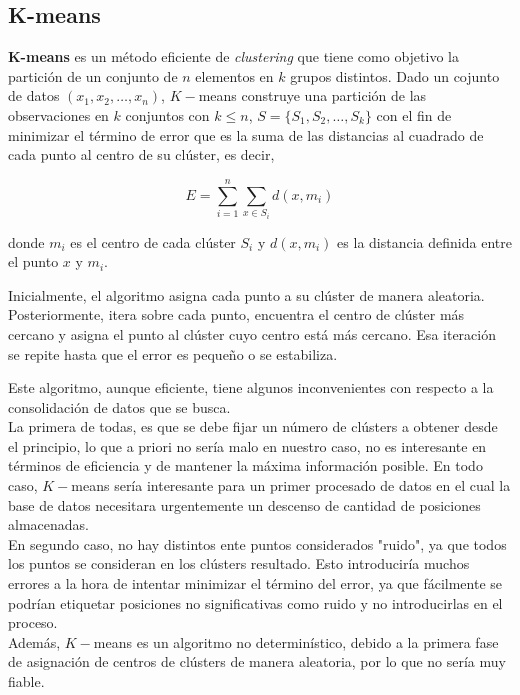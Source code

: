 \documentclass[a4paper, 12pt]{article}
\begin{document}
\pagebreak
\subsection{K-means}

\textbf{K-means} es un m\'etodo eficiente de \textit{clustering} que tiene como objetivo la partici\'on de un conjunto de $n$ elementos en $k$ grupos distintos. Dado un cojunto de datos $(x_1, x_2, \ldots , x_n)$, $K-$means construye una partici\'on de las observaciones en $k$ conjuntos con $k\leq n$, $S=\{S_1, S_2, \ldots, S_k\}$ con el fin de minimizar el t\'ermino de error que es la suma de las distancias al cuadrado de cada punto al centro de su cl\'uster, es decir,

$$ E=\sum_{i=1}^{n} \sum_{x\in S_i} d(x, m_i) $$

donde $m_i$ es el centro de cada cl\'uster $S_i$ y $d(x, m_i)$ es la distancia definida entre el punto $x$ y $m_i$.

Inicialmente, el algoritmo asigna cada punto a su cl\'uster de manera aleatoria. Posteriormente, itera sobre cada punto, encuentra el centro de cl\'uster m\'as cercano y asigna el punto al cl\'uster cuyo centro est\'a m\'as cercano. Esa iteraci\'on se repite hasta que el error es peque\~no o se estabiliza.

Este algoritmo, aunque eficiente, tiene algunos inconvenientes con respecto a la consolidaci\'on de datos que se busca.
\\

La primera de todas, es que se debe fijar un n\'umero de cl\'usters a obtener desde el principio, lo que a priori no ser\'ia malo en nuestro caso, no es interesante en t\'erminos de eficiencia y de mantener la m\'axima informaci\'on posible. En todo caso, $K-$means ser\'ia interesante para un primer procesado de datos en el cual la base de datos necesitara urgentemente un descenso de cantidad de posiciones almacenadas. \\

En segundo caso, no hay distintos ente puntos considerados "ruido", ya que todos los puntos se consideran en los cl\'usters resultado. Esto introducir\'ia muchos errores a la hora de intentar minimizar el t\'ermino del error, ya que f\'acilmente se podr\'ian etiquetar posiciones no significativas como ruido y no introducirlas en el proceso.\\

Adem\'as, $K-$means es un algoritmo no determin\'istico, debido a la primera fase de asignaci\'on de centros de cl\'usters de manera aleatoria, por lo que no ser\'ia muy fiable.
\end{document}
